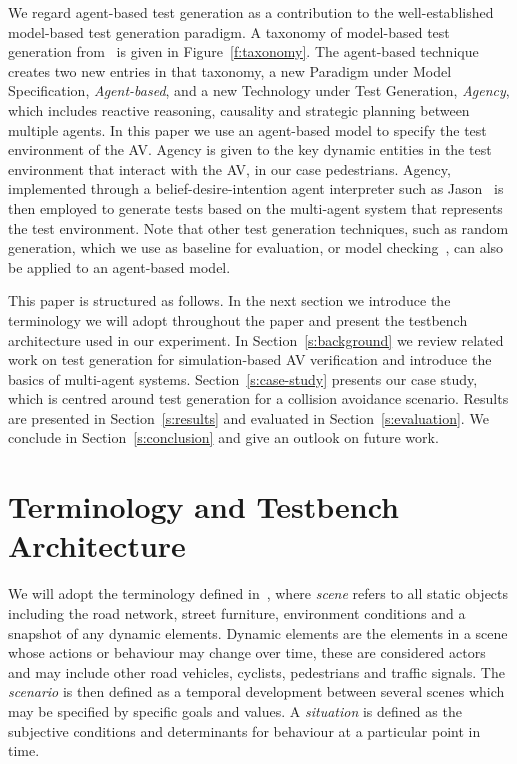 \documentclass[runningheads,a4paper]{llncs}
\begin{document}
We regard agent-based test generation as a contribution to the well-established model-based test generation paradigm. A taxonomy of model-based test generation from~\cite{utting2012taxonomy} is given in Figure~\ref{f:taxonomy}.
%
The agent-based technique creates two new entries in that taxonomy, a new Paradigm under Model Specification, \textit{Agent-based}, and a new Technology under Test Generation, \textit{Agency}, which includes reactive reasoning, causality and strategic planning between multiple agents.
%
In this paper we use an agent-based model to specify the test environment of the AV. Agency is given to the key dynamic entities in the test environment that interact with the AV, in our case pedestrians. Agency, implemented through a belief-desire-intention agent interpreter such as Jason~\cite{bordini2005jason} is then employed to generate tests based on the multi-agent system that represents the test environment. Note that other test generation techniques, such as random generation, which we use as baseline for evaluation, or model checking~\cite{Bordini2006}, can also be applied to an agent-based model.	

This paper is structured as follows. In the next section we introduce the terminology we will adopt throughout the paper and present the testbench architecture used in our experiment. In Section~\ref{s:background} we review related work on test generation for simulation-based AV verification and introduce the basics of multi-agent systems. Section~\ref{s:case-study} presents our case study, which is centred around test generation for a collision avoidance scenario. Results are presented in Section~\ref{s:results} and evaluated in Section~\ref{s:evaluation}. We conclude in Section~\ref{s:conclusion} and give an outlook on future work. 

\section{Terminology and Testbench Architecture}\label{s:testbench}

We will adopt the terminology defined in~\cite{Ulbrich2015}, where \textit{scene} refers to all static objects including the road network, street furniture, environment conditions and a snapshot of any dynamic elements. Dynamic elements are the elements in a scene whose actions or behaviour may change over time, these are considered actors and may include other road vehicles, cyclists, pedestrians and traffic signals. 
%
The \textit{scenario} is then defined as a temporal development between several scenes which may be specified by specific goals and values.
%
A \textit{situation} is defined as the subjective conditions and determinants for behaviour at a particular point in time. 
\end{document}
